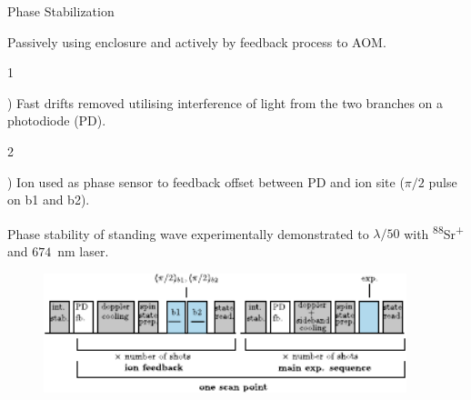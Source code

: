 \documentclass[final]{beamer}
\newcommand{\SubItem}[1]{
    {\setlength\itemindent{15pt} \item[] #1}
}
\begin{document}
\begin{frame}{}
\begin{center}
\begin{columns}[t]
\begin{column}{0.49\textwidth}
\begin{alertblock}{Phase Stabilization}
\begin{minipage}{0.47\linewidth}
      \end{minipage}
      \begin{minipage}{0.53\linewidth}
      \begin{itemize}
      \item Passively using enclosure and actively by feedback process to AOM.\\
      \SubItem 1) Fast drifts removed utilising interference of light
            from the two branches on a photodiode (PD).\\

      \SubItem 2) Ion used as phase
            sensor to feedback offset between PD and ion site ($\pi/2$ pulse on b1 and b2). \\
      \item Phase stability of standing wave experimentally
        demonstrated to $\lambda/50$ with
        \textsuperscript{88}Sr\textsuperscript{+} and $674$~nm laser.

      \begin{figure}
        \includegraphics[width=0.94\textwidth]{./figs/beam_seq.pdf}
      \end{figure}

      \end{itemize}
      \end{minipage}
    \end{alertblock}


\end{column}
\end{columns}
\end{center}
\end{frame}
\end{document}

